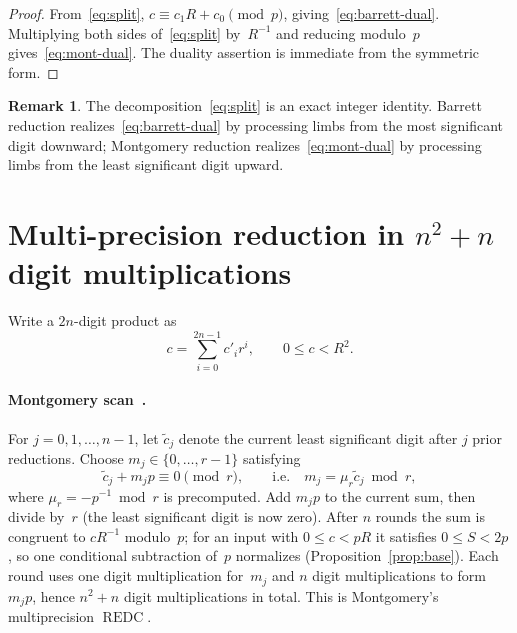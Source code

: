 \documentclass[reqno]{amsart}
\theoremstyle{definition}
\newtheorem{remark}[theorem]{Remark}
\DeclareMathOperator{\redc}{REDC}
\begin{document}
\begin{proof}
From~\eqref{eq:split}, $c\equiv c_1R+c_0\pmod p$, giving~\eqref{eq:barrett-dual}.
Multiplying both sides of~\eqref{eq:split} by~$R^{-1}$ and reducing modulo~$p$ gives~\eqref{eq:mont-dual}.
The duality assertion is immediate from the symmetric form.
\end{proof}

\begin{remark}
The decomposition~\eqref{eq:split} is an exact integer identity.
Barrett reduction realizes~\eqref{eq:barrett-dual} by processing limbs from the most significant digit downward;
Montgomery reduction realizes~\eqref{eq:mont-dual} by processing limbs from the least significant digit upward.
\end{remark}

\section{Multi-precision reduction in $n^2+n$ digit multiplications}\label{sec:baseline}

Write a $2n$-digit product as
\[
  c = \sum_{i=0}^{2n-1} c'_i r^i, \qquad 0 \le c < R^2.
\]

\paragraph{Montgomery scan~\cite{montgomery}.}
For $j=0,1,\ldots,n-1$, let $\tilde c_j$ denote the current least significant digit after $j$ prior reductions.
Choose $m_j\in\{0,\ldots,r-1\}$ satisfying
\[
  \tilde c_j + m_j p \equiv 0 \pmod r,
  \qquad\text{i.e.}\quad m_j = \mu_r \tilde c_j \bmod r,
\]
where $\mu_r= -p^{-1}\bmod r$ is precomputed.
Add $m_jp$ to the current sum, then divide by~$r$ (the least significant digit is now zero).
After $n$ rounds the sum is congruent to $cR^{-1}$ modulo~$p$; for an input with $0\le c<pR$ it satisfies $0\le S<2p$, so one conditional subtraction of~$p$ normalizes (Proposition~\ref{prop:base}).
Each round uses one digit multiplication for~$m_j$ and $n$ digit multiplications to form~$m_jp$, hence $n^2+n$ digit multiplications in total.
This is Montgomery's multiprecision $\redc$.
\end{document}
